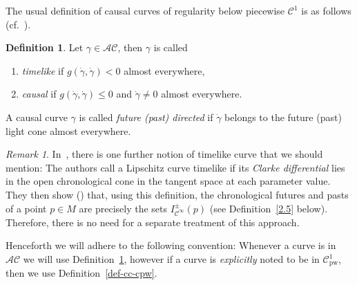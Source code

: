 \documentclass[reqno]{amsart}
\numberwithin{equation}{section}
\theoremstyle{plain}
\theoremstyle{definition}
\newtheorem{definition}[theorem]{Definition}
\theoremstyle{remark}
\newtheorem{remark}[theorem]{Remark}
\newcommand{\Con}{\mathcal{C}}
\newcommand{\copw}{\mathcal{C}^1_{\mathrm{pw}}}
\begin{document}
The usual definition of causal curves of regularity below piecewise $\mathcal{C}^1$ is as follows
(cf.~\cite[Def.\ 1.3]{CG:12}).
\begin{definition}\label{def-cc-ac}
 Let $\gamma\in\mathcal{AC}$, then 
$\gamma$ is 
called
\begin{enumerate}
 \item \emph{timelike} if $g(\dot\gamma,\dot\gamma)<0$ almost everywhere,
 \item \emph{causal} if $g(\dot\gamma,\dot\gamma)\leq 0$ and $\dot\gamma\neq0$ almost everywhere.
\end{enumerate}
A causal curve $\gamma$ is called \emph{future (past) directed} if $\dot\gamma$ belongs to the future (past) light cone 
almost everywhere.
\end{definition}
\begin{remark} In~\cite{BS:18}, there is one further notion of timelike curve that we 
should mention: The authors call a Lipschitz curve timelike if its \emph{Clarke differential\/}
lies in the open chronological cone in the tangent space at each parameter value. 
They then show (\cite[Lem.\ 2.11]{BS:18}) that, using this definition, the chronological
futures and pasts of a point $p\in M$ are precisely the sets $I^\pm_{\Con^\infty}(p)$ (see Definition~\ref{2.5} below).
Therefore, there is no need for a separate treatment of this approach.
\end{remark}

Henceforth we will adhere to the following convention: Whenever a curve is in $\mathcal{AC}$ we will use Definition~\ref{def-cc-ac}, 
however if a curve is \emph{explicitly\/} noted to be in $\copw$, then we use Definition~\ref{def-cc-cpw}.
\end{document}
